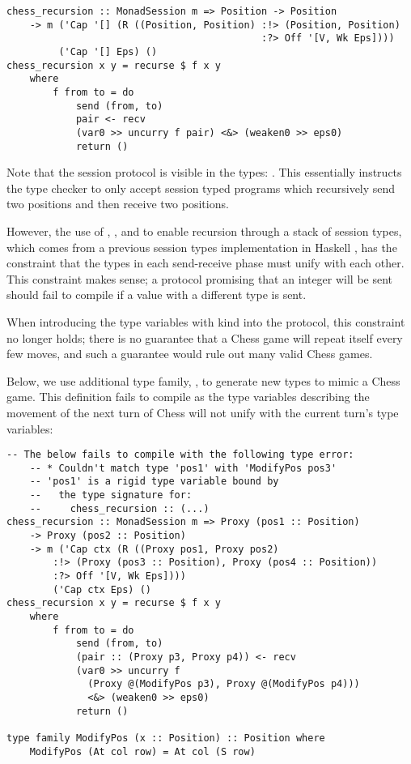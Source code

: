 \begin{lstlisting}
chess_recursion :: MonadSession m => Position -> Position
    -> m ('Cap '[] (R ((Position, Position) :!> (Position, Position)
                                            :?> Off '[V, Wk Eps])))
         ('Cap '[] Eps) ()
chess_recursion x y = recurse $ f x y
    where
        f from to = do
            send (from, to)
            pair <- recv
            (var0 >> uncurry f pair) <&> (weaken0 >> eps0)
            return ()
\end{lstlisting}

Note that the session protocol is visible in the types: . This essentially instructs the type checker to only accept session typed programs which recursively send two positions and then receive two positions.

However, the use of , , and  to enable recursion through a stack of session types, which comes from a previous session types implementation in Haskell \cite{sessalmostnoclass}, has the constraint that the types in each send-receive phase must unify with each other. This constraint makes sense; a protocol promising that an integer will be sent should fail to compile if a value with a different type is sent.

When introducing the type variables with kind  into the protocol, this constraint no longer holds; there is no guarantee that a Chess game will repeat itself every few moves, and such a guarantee would rule out many valid Chess games.

Below, we use additional type family, , to generate new  types to mimic a Chess game. This definition fails to compile as the type variables describing the movement of the next turn of Chess will not unify with the current turn's type variables:

\begin{lstlisting}
-- The below fails to compile with the following type error:
    -- * Couldn't match type 'pos1' with 'ModifyPos pos3'
    -- 'pos1' is a rigid type variable bound by
    --   the type signature for:
    --     chess_recursion :: (...)
chess_recursion :: MonadSession m => Proxy (pos1 :: Position)
    -> Proxy (pos2 :: Position)
    -> m ('Cap ctx (R ((Proxy pos1, Proxy pos2)
        :!> (Proxy (pos3 :: Position), Proxy (pos4 :: Position))
        :?> Off '[V, Wk Eps])))
        ('Cap ctx Eps) ()
chess_recursion x y = recurse $ f x y
    where
        f from to = do
            send (from, to)
            (pair :: (Proxy p3, Proxy p4)) <- recv
            (var0 >> uncurry f
              (Proxy @(ModifyPos p3), Proxy @(ModifyPos p4)))
              <&> (weaken0 >> eps0)
            return ()

type family ModifyPos (x :: Position) :: Position where
    ModifyPos (At col row) = At col (S row)
\end{lstlisting}

